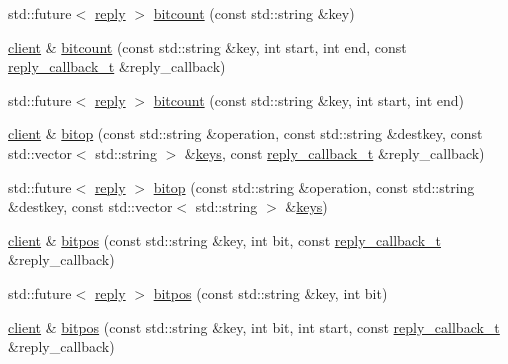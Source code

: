 \begin{DoxyCompactItemize}
\item 
std\+::future$<$ \hyperlink{classcpp__redis_1_1reply}{reply} $>$ \hyperlink{classcpp__redis_1_1client_ac667b96661726874bc237c84de1ddd89}{bitcount} (const std\+::string \&key)
\item 
\hyperlink{classcpp__redis_1_1client}{client} \& \hyperlink{classcpp__redis_1_1client_ac631a06c8b69a2f1b4de3aabc19d68e2}{bitcount} (const std\+::string \&key, int start, int end, const \hyperlink{classcpp__redis_1_1client_a061a1140d36d2eaeda82b09a0bb3f9f2}{reply\+\_\+callback\+\_\+t} \&reply\+\_\+callback)
\item 
std\+::future$<$ \hyperlink{classcpp__redis_1_1reply}{reply} $>$ \hyperlink{classcpp__redis_1_1client_af2d2dc1c19d735e84d8e2725fb98dbda}{bitcount} (const std\+::string \&key, int start, int end)
\item 
\hyperlink{classcpp__redis_1_1client}{client} \& \hyperlink{classcpp__redis_1_1client_a9289b0f474073f59509b565d93c69506}{bitop} (const std\+::string \&operation, const std\+::string \&destkey, const std\+::vector$<$ std\+::string $>$ \&\hyperlink{classcpp__redis_1_1client_acb7845a206b2321e6919c2f38282c322}{keys}, const \hyperlink{classcpp__redis_1_1client_a061a1140d36d2eaeda82b09a0bb3f9f2}{reply\+\_\+callback\+\_\+t} \&reply\+\_\+callback)
\item 
std\+::future$<$ \hyperlink{classcpp__redis_1_1reply}{reply} $>$ \hyperlink{classcpp__redis_1_1client_adbb955ee435dea43898ef811b31421b3}{bitop} (const std\+::string \&operation, const std\+::string \&destkey, const std\+::vector$<$ std\+::string $>$ \&\hyperlink{classcpp__redis_1_1client_acb7845a206b2321e6919c2f38282c322}{keys})
\item 
\hyperlink{classcpp__redis_1_1client}{client} \& \hyperlink{classcpp__redis_1_1client_adf2ef5d020a8efbf6f6eb91cde63f262}{bitpos} (const std\+::string \&key, int bit, const \hyperlink{classcpp__redis_1_1client_a061a1140d36d2eaeda82b09a0bb3f9f2}{reply\+\_\+callback\+\_\+t} \&reply\+\_\+callback)
\item 
std\+::future$<$ \hyperlink{classcpp__redis_1_1reply}{reply} $>$ \hyperlink{classcpp__redis_1_1client_a5be47a4b3f9a36c4fab420468d50256a}{bitpos} (const std\+::string \&key, int bit)
\item 
\hyperlink{classcpp__redis_1_1client}{client} \& \hyperlink{classcpp__redis_1_1client_a8f6b7958a3094c975c3ca053b263c523}{bitpos} (const std\+::string \&key, int bit, int start, const \hyperlink{classcpp__redis_1_1client_a061a1140d36d2eaeda82b09a0bb3f9f2}{reply\+\_\+callback\+\_\+t} \&reply\+\_\+callback)

\end{DoxyCompactItemize}

